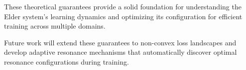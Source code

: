 These theoretical guarantees provide a solid foundation for understanding the Elder system's learning dynamics and optimizing its configuration for efficient training across multiple domains.

Future work will extend these guarantees to non-convex loss landscapes and develop adaptive resonance mechanisms that automatically discover optimal resonance configurations during training.